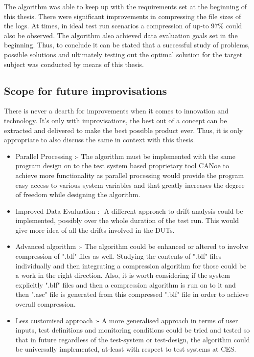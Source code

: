 The algorithm was able to keep up with the requirements set at the beginning of this thesis. There were significant improvements in compressing the file sizes of the logs. At times, in ideal test run scenarios a compression of up-to 97\% could also be observed. The algorithm also achieved data evaluation goals set in the beginning. Thus, to conclude it can be stated that a successful study of problems, possible solutions and ultimately testing out the optimal solution for the target subject was conducted by means of this thesis.


\newpage

\subsection{Scope for future improvisations}

There is never a dearth for improvements when it comes to innovation and technology. It's only with improvisations, the best out of a concept can be extracted and delivered to make the best possible product ever.  Thus, it is only appropriate to also discuss the same in context with this thesis. 

\begin{itemize}
    \item Parallel Processing :- The algorithm must be implemented with the same program design on to the test system based proprietary tool CANoe to achieve more functionality as parallel processing would provide the program easy access to various system variables and that greatly increases the degree of freedom while designing the algorithm.

    \item Improved Data Evaluation :- A different approach to drift analysis could be implemented, possibly over the whole duration of the test run. This would give more idea of all the drifts involved in the DUTs. 

    \item Advanced algorithm  :- The algorithm could be enhanced or altered to involve compression of ".blf" files as well. Studying the contents of ".blf" files individually and then integrating a compression algorithm for those could be a work in the right direction. Also, it is worth considering if the system explicitly ".blf" files and then a compression algorithm is run on to it and then ".asc" file is generated from this compressed ".blf" file in order to achieve overall compression.

    \item Less customised approach :- A more generalised approach in terms of user inputs, test definitions and monitoring conditions could be tried and tested so that in future regardless of the test-system or test-design, the algorithm could be universally implemented, at-least with respect to test systems at CES. 
    
\end{itemize}